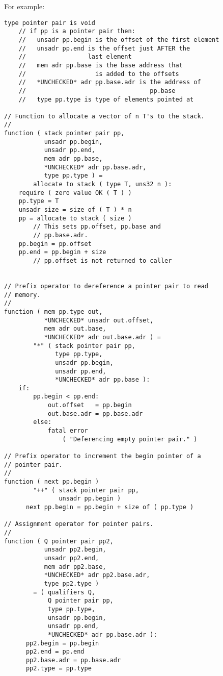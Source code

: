 \documentclass[12pt]{article}
\newenvironment{indpar}[1][0.3in]%
	{\begin{list}{}%
		     {\setlength{\itemsep}{0in}%
		      \setlength{\topsep}{0in}%
		      \setlength{\parsep}{1ex}%
		      \setlength{\labelwidth}{#1}%
		      \setlength{\leftmargin}{#1}%
		      \addtolength{\leftmargin}{\labelsep}}%
	 \item}%
	{\end{list}}
\begin{document}
For example:
\begin{indpar}\begin{verbatim}
type pointer pair is void
    // if pp is a pointer pair then:
    //   unsadr pp.begin is the offset of the first element
    //   unsadr pp.end is the offset just AFTER the
    //                 last element
    //   mem adr pp.base is the base address that
    //                   is added to the offsets
    //   *UNCHECKED* adr pp.base.adr is the address of
    //                                  pp.base
    //   type pp.type is type of elements pointed at

// Function to allocate a vector of n T's to the stack.
//
function ( stack pointer pair pp,
           unsadr pp.begin,
           unsadr pp.end,
           mem adr pp.base,
           *UNCHECKED* adr pp.base.adr,
           type pp.type ) =
        allocate to stack ( type T, uns32 n ):
    require ( zero value OK ( T ) )
    pp.type = T
    unsadr size = size of ( T ) * n
    pp = allocate to stack ( size )
        // This sets pp.offset, pp.base and
        // pp.base.adr.
    pp.begin = pp.offset
    pp.end = pp.begin + size
        // pp.offset is not returned to caller


// Prefix operator to dereference a pointer pair to read
// memory.
//
function ( mem pp.type out,
           *UNCHECKED* unsadr out.offset,
           mem adr out.base,
           *UNCHECKED* adr out.base.adr ) =
        "*" ( stack pointer pair pp,
              type pp.type,
              unsadr pp.begin,
              unsadr pp.end,
              *UNCHECKED* adr pp.base ):
    if:
        pp.begin < pp.end:
            out.offset   = pp.begin
            out.base.adr = pp.base.adr
        else:
            fatal error
                ( "Deferencing empty pointer pair." )

// Prefix operator to increment the begin pointer of a
// pointer pair.
//
function ( next pp.begin )
        "++" ( stack pointer pair pp,
               unsadr pp.begin )
      next pp.begin = pp.begin + size of ( pp.type )

// Assignment operator for pointer pairs.
//
function ( Q pointer pair pp2,
           unsadr pp2.begin,
           unsadr pp2.end,
           mem adr pp2.base,
           *UNCHECKED* adr pp2.base.adr,
           type pp2.type )
        = ( qualifiers Q,
            Q pointer pair pp,
            type pp.type,
            unsadr pp.begin,
            unsadr pp.end,
            *UNCHECKED* adr pp.base.adr ):
      pp2.begin = pp.begin
      pp2.end = pp.end
      pp2.base.adr = pp.base.adr
      pp2.type = pp.type


\end{verbatim}
\end{indpar}
\end{document}

